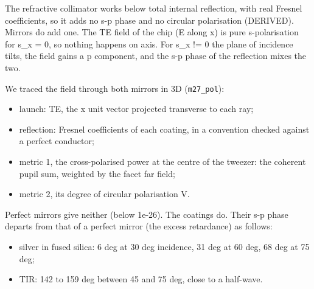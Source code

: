 The refractive collimator works below total internal reflection, with
real Fresnel coefficients, so it adds no s-p phase and no circular
polarisation (DERIVED). Mirrors do add one. The TE field of the chip (E
along x) is pure s-polarisation for s\_x = 0, so nothing happens on
axis. For s\_x != 0 the plane of incidence tilts, the field gains a p
component, and the s-p phase of the reflection mixes the two.

We traced the field through both mirrors in 3D (\texttt{m27\_pol}):

\begin{itemize}
\tightlist
\item
  launch: TE, the x unit vector projected transverse to each ray;
\item
  reflection: Fresnel coefficients of each coating, in a convention
  checked against a perfect conductor;
\item
  metric 1, the cross-polarised power at the centre of the tweezer: the
  coherent pupil sum, weighted by the facet far field;
\item
  metric 2, its degree of circular polarisation V.
\end{itemize}

Perfect mirrors give neither (below 1e-26). The coatings do. Their s-p
phase departs from that of a perfect mirror (the excess retardance) as
follows:

\begin{itemize}
\tightlist
\item
  silver in fused silica: 6 deg at 30 deg incidence, 31 deg at 60 deg,
  68 deg at 75 deg;
\item
  TIR: 142 to 159 deg between 45 and 75 deg, close to a half-wave.
\end{itemize}

